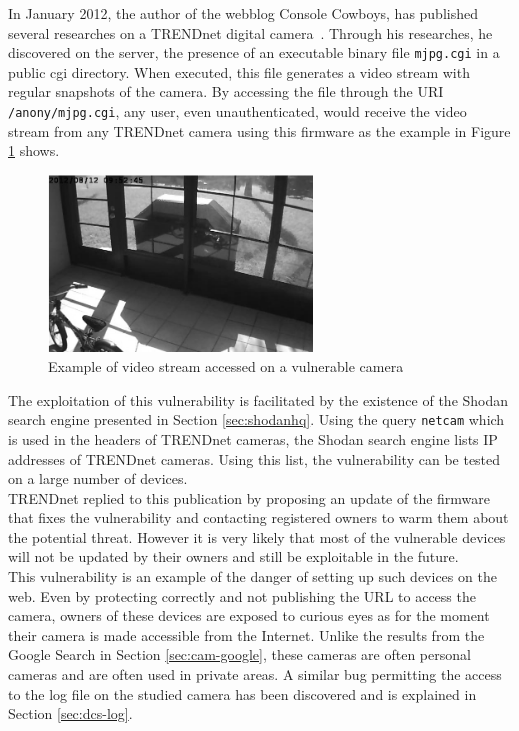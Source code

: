 In January 2012, the author of the webblog Console Cowboys, has published several researches on a TRENDnet digital camera~\cite{trendnet-hack}.
Through his researches, he discovered on the server, the presence of an executable binary file \texttt{mjpg.cgi} in a public cgi directory.
When executed, this file generates a video stream with regular snapshots of the camera.
By accessing the file through the URI \texttt{/anony/mjpg.cgi}, any user, even unauthenticated, would receive the video stream from any TRENDnet camera using this firmware as the example in Figure \ref{fig:trendnet-hack} shows.\\

\begin{figure}[h]
  \centering
  \includegraphics[width=7cm]{images/trendnet-hack2.png}
  \caption{Example of video stream accessed on a vulnerable camera}
  \label{fig:trendnet-hack}
\end{figure}

The exploitation of this vulnerability is facilitated by the existence of the Shodan search engine presented in Section \ref{sec:shodanhq}.
Using the query \texttt{netcam} which is used in the headers of TRENDnet cameras, the Shodan search engine lists IP addresses of TRENDnet cameras.
Using this list, the vulnerability can be tested on a large number of devices.\\

TRENDnet replied to this publication by proposing an update of the firmware that fixes the vulnerability and contacting registered owners to warm them about the potential threat.
However it is very likely that most of the vulnerable devices will not be updated by their owners and still be exploitable in the future.\\

This vulnerability is an example of the danger of setting up such devices on the web.
Even by protecting correctly and not publishing the URL to access the camera, owners of these devices are exposed to curious eyes as for the moment their camera is made accessible from the Internet.
Unlike the results from the Google Search in Section \ref{sec:cam-google}, these cameras are often personal cameras and are often used in private areas.
A similar bug permitting the access to the log file on the studied camera has been discovered and is explained in Section \ref{sec:dcs-log}.
